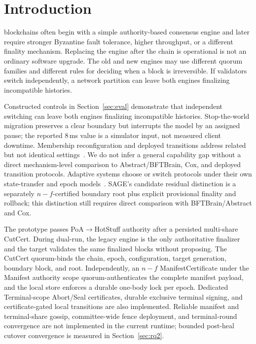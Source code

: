 \documentclass[journal]{IEEEtran}
\theoremstyle{definition}
\theoremstyle{remark}
\begin{document}
\section{Introduction}
 blockchains often begin with a simple authority-based consensus
engine and later require stronger Byzantine fault tolerance, higher throughput, or a different
finality mechanism. Replacing the engine after the chain is operational is not an ordinary
software upgrade. The old and new engines may use different quorum families and different rules
for deciding when a block is irreversible. If validators switch independently, a network
partition can leave both engines finalizing incompatible histories.

Constructed controls in Section~\ref{sec:eval} demonstrate that independent switching can leave
both engines finalizing incompatible histories. Stop-the-world migration preserves a clear boundary
but interrupts the model by an assigned pause; the reported $8$\,ms value is a simulator input, not
measured client downtime. Membership reconfiguration and deployed transitions address related but
not identical settings~\cite{reconfig,bftsmart,ethereummerge,eip3675,gasper,grandpa,tendermint,tenderbake}.
We do not infer a general capability gap without a direct mechanism-level comparison to
Abstract/BFTBrain, Cox, and deployed transition protocols. Adaptive systems choose or switch
protocols under their own state-transfer and epoch models~\cite{abstract,bftbrain,adachain,adaptbft,threatadapt,adacon}.
SAGE's candidate residual distinction is a separately $n-f$-certified boundary root plus explicit
provisional finality and rollback; this distinction still requires direct comparison with
BFTBrain/Abstract and Cox.

The prototype passes PoA$\rightarrow$HotStuff authority after a persisted multi-share CutCert. During
dual-run, the legacy engine is the only authoritative finalizer and the target validates the same
finalized blocks without proposing. The CutCert quorum-binds the chain, epoch, configuration, target
generation, boundary block, and root. Independently, an $n-f$ ManifestCertificate under the Manifest
authority scope quorum-authenticates the complete manifest payload, and the local store enforces a
durable one-body lock per epoch. Dedicated Terminal-scope Abort/Seal certificates, durable exclusive
terminal signing, and certificate-gated local transitions are also implemented. Reliable manifest
and terminal-share gossip, committee-wide fence deployment, and terminal-round convergence are not
implemented in the current runtime; bounded post-heal cutover convergence is measured in
Section~\ref{sec:rq2}.
\end{document}
